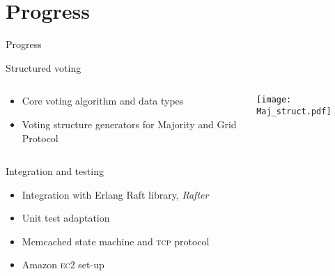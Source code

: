 \documentclass{beamer}
\begin{document}
\section{Progress}
\begin{frame}{Progress}
    \begin{block}{Structured voting}
        \begin{columns}
            \begin{column}{.7\textwidth}
                \begin{itemize}
                    \item Core voting algorithm and data types
                    \item Voting structure generators for Majority and Grid Protocol
                \end{itemize}
            \end{column}
            \begin{column}{.2\textwidth}
                \bigskip

                \hspace*{-12mm}\texttt{[image: Maj\_struct.pdf]}
            \end{column}
        \end{columns}
    \end{block}
    \begin{block}{Integration and testing}
        \begin{itemize}
            \item Integration with Erlang Raft library, \emph{Rafter} %
            \item Unit test adaptation %
            \item Memcached state machine and \textsc{tcp} protocol
            \item Amazon \textsc{ec2} set-up
        \end{itemize}
    \end{block}
\end{frame}
\end{document}
